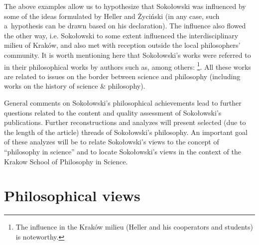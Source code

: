 \documentclass[%
  manuscript=article,
  year=2024,
  volume=77,
  doi=00000.000,
]{zfn}
\begin{document}
The above examples allow us to hypothesize that Sokołowski was influenced by some of the ideas formulated by Heller and Życiński (in any case, such a~hypothesis can be drawn based on his declaration). The influence also flowed the other way, i.e. Sokołowski to some extent influenced the interdisciplinary milieu of Kraków, and also met with reception outside the local philosophers' community. It is worth mentioning here that Sokołowski's works were referred to in their philosophical works by authors such as, among others: 
\parencites[][]{Burtyn1997Idea}[][]{Turek2005Filozofia}[][]{Jodkowski2007Spor}[][]{Filipek2008Elementy}[][]{Czerniawski2009Ruch}[][]{Czerniawski2012Protofizyka}[][]{Zycinski2009Wszechswiat}[][]{Grygiel2010Teoria}[][]{Szydowski2010Prostota}[][]{Szydowski2015Ontologiczne}[][]{Szydowski2020Czy}[][]{Heller2013Filozofia}[][]{Heller2014Granice}[][]{Pabjan2013Filozoficzne}[][]{Hoda2014Teistyczne}[][]{Dabek2016Nauka}[][]{Janowski2016Zagadnienie}[][]{Janusz2017Stulecie}[][]{Jacyna2018Kosmologia}[][]{Sobkowiak2019Relacje}[][]{Lemanska2020Mathematicalness}[][]{Trombik2021Koncepcje}%
\footnote{The influence in the Kraków milieu (Heller and his cooperators and students) is noteworthy.}. All these works are related to issues on the border between science and philosophy (including works on the history of science \& philosophy).



General comments on Sokołowski's philosophical achievements lead to further questions related to the content and quality assessment of Sokołowski's publications. Further reconstructions and analyzes will present selected (due to the length of the article) threads of Sokołowski's philosophy. An important goal of these analyzes will be to relate Sokołowski's views to the concept of ``philosophy in science'' and to locate Sokołowski's views in the context of the Krakow School of Philosophy in Science.



\section{Philosophical views}
\end{document}
